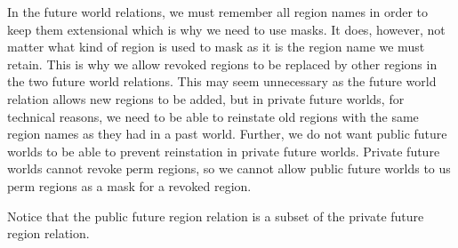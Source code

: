 \documentclass[format=acmsmall, review=true, screen=true]{acmart}
\newcommand{\plainview}[1]{\mathrm{#1}}
\newcommand{\perma}{\plainview{perm}}
\newcommand{\temp}{\plainview{temp}}
\newcommand{\revoked}{\plainview{revoked}}
\newenvironment{toplas}{}{}
\begin{document}
\begin{toplas}
  In the future world relations, we must remember all region names in order to
  keep them extensional which is why we need to use masks. It does, however, not
  matter what kind of region is used to mask as it is the region name we must
  retain. This is why we allow $\revoked$ regions to be replaced by other
  regions in the two future world relations. This may seem unnecessary as the
  future world relation allows new regions to be added, but in private future
  worlds, for technical reasons, we need to be able to reinstate old regions
  with the same region names as they had in a past world. Further, we do not
  want public future worlds to be able to prevent reinstation in private future
  worlds. Private future worlds cannot revoke $\perma$ regions, so we cannot
  allow public future worlds to us $\perma$ regions as a mask for a revoked
  region.
\end{toplas}

Notice that the public future region relation is a subset of the private future
region relation.



\end{document}

